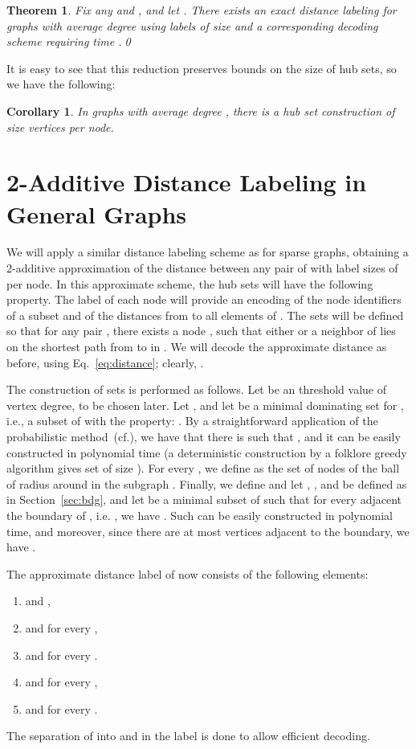 \documentclass{article}[11pt,letter]
\newtheorem{theorem}[definition]{Theorem}
\newtheorem{corollary}[definition]{Corollary}
\begin{document}
\begin{theorem}
Fix any   and , and let . There exists an exact distance labeling for graphs with average degree  using labels of size 
 and a corresponding decoding scheme requiring time .\qed
\end{theorem}

It is easy to see that this reduction preserves bounds on the size of hub sets, so we have the following:
\begin{corollary}
In graphs with average degree , there is a hub set construction of size  vertices per node.
\end{corollary}

\section{2-Additive Distance Labeling in General Graphs}\label{sec:general}

We will apply a similar distance labeling scheme as for sparse graphs, obtaining a 2-additive approximation of the distance between any pair of  with label sizes of  per node. In this approximate scheme, the hub sets will have the following property.  The label of each node  will provide an encoding of the node identifiers of a subset  and of the distances from  to all elements of . The sets  will be defined so that for any pair , there exists a node , such that either  or a neighbor of  lies on the shortest path from  to  in . We will decode the approximate distance as before, using Eq.~\eqref{eq:distance}; clearly, .

The construction of sets  is performed as follows. Let  be an threshold value of vertex degree, to be chosen later. Let , and let  be a minimal dominating set for , i.e., a subset of  with the property: . By a straightforward application of the probabilistic method~(cf.\cite[proof of Theorem 1.2.2]{probmethod}), we have that there is  such that , and it can be easily constructed in polynomial time (a deterministic construction by a folklore greedy algorithm gives set of size ). For every , we define  as the set of nodes of the ball of radius  around  in the subgraph .  Finally, we define  and let , , and  be defined as in Section~\ref{sec:bdg}, and let  be a minimal subset of  such that for every  adjacent the boundary of , i.e. , we have . Such  can be easily constructed in polynomial time, and moreover, since there are at most  vertices adjacent to the boundary, we have .

The approximate distance label of  now consists of the following elements:
\begin{enumerate}
\item  and ,
\item  and  for every ,
\item  and  for every .
\item  and  for every ,
\item  and  for every .
\end{enumerate}
The separation of  into  and  in the label is done to allow
efficient decoding.
\end{document}
